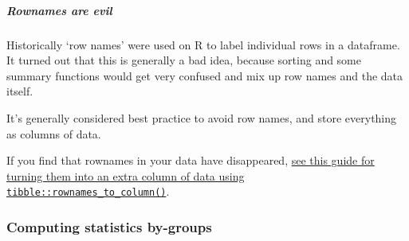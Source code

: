 \documentclass[]{article}
\let\oldsubparagraph\subparagraph
\renewcommand{\subparagraph}[1]{\oldsubparagraph{#1}\mbox{}}
\theoremstyle{definition}
\theoremstyle{definition}
\theoremstyle{definition}
\theoremstyle{remark}
\begin{document}
\subparagraph{Rownames are evil}\label{rownames-are-evil}

Historically `row names' were used on R to label individual rows in a
dataframe. It turned out that this is generally a bad idea, because
sorting and some summary functions would get very confused and mix up
row names and the data itself.

It's generally considered best practice to avoid row names, and store
everything as columns of data.

If you find that rownames in your data have disappeared,
\protect\hyperlink{rownames}{see this guide for turning them into an
extra column of data using \texttt{tibble::rownames\_to\_column()}}.

\subsubsection*{Computing statistics
by-groups}\label{computing-statistics-by-groups}
\end{document}
